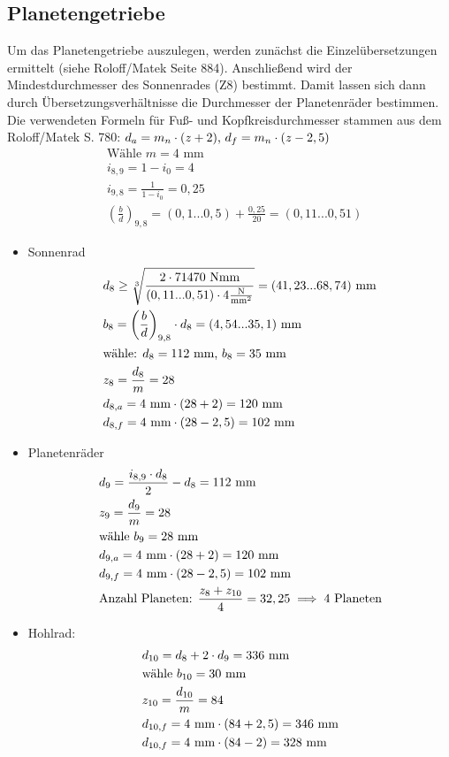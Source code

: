 \subsection{Planetengetriebe}
Um das Planetengetriebe auszulegen, werden zunächst die Einzelübersetzungen ermittelt (siehe Roloff/Matek Seite 884). Anschließend wird der Mindestdurchmesser des Sonnenrades (Z8) bestimmt. Damit lassen sich dann durch Übersetzungsverhältnisse die Durchmesser der Planetenräder bestimmen.
Die verwendeten Formeln für Fuß- und Kopfkreisdurchmesser stammen aus dem Roloff/Matek S. 780: $d_a = m_n \cdot (z + 2) \text{, } d_f = m_n \cdot (z-2,5) $
\begin{align*}
	&\text{Wähle } m=4  \text{ mm} \\
	&i_{8,9} = 1 - i_0 = 4 \\
	&i_{9,8} = \frac{1}{1-i_0}  = 0,25 \\
	& \left(\frac{b}{d} \right) _{9,8} = (0,1...0,5) + \frac{0,25}{20}  =  (0,11...0,51) 
\end{align*}
\begin{itemize}
\item Sonnenrad
\begin{align*}
	&d_8 \ge \sqrt[3]{\frac{2 \cdot 71470 \text{ Nmm}}{(0,11...0,51) \cdot  4 \frac{\text{N}}{\text{mm}^2}}}= (41,23...68,74) \text{ mm}\\
	&b_8= \left(\frac{b}{d} \right) _{9,8}  \cdot d_8 = (4,54...35,1) \text{ mm}  \\
	&\text{wähle: } d_8 = 112 \text{ mm, } b_8 = 35 \text{ mm}  \\
	&z_8 = \frac{d_8}{m} = 28 \\
	&d_{8,a} = 4\text{ mm} \cdot (28+2) =120\text{ mm} \\
	&d_{8,f} = 4\text{ mm} \cdot (28-2,5) =102\text{ mm} 
\end{align*}
\item Planetenräder 
\begin{align*}
	&d_9 = \frac{i_{8,9} \cdot d_8}{2 } - d_8 = 112 \text{ mm}  \\
	&z_9 = \frac{d_9}{m} = 28 \\
	&\text{wähle }  b_9 = 28 \text{ mm}  \\
	&d_{9,a} = 4\text{ mm} \cdot (28+2) =120\text{ mm} \\
	&d_{9,f} = 4\text{ mm} \cdot (28-2,5) =102\text{ mm} \\ 
	&\text{Anzahl Planeten: } \frac{z_{8} + z_{10}}{4} = 32,25 \implies 4 \text{ Planeten} 
\end{align*}	
\item Hohlrad:
\begin{align*}
	&d_{10} = d_8 + 2\cdot d_9 = 336 \text{ mm}  \\
	&\text{wähle }  b_{10} = 30 \text{ mm}  \\
	&z_{10}  = \frac{d_{10}}{m} = 84 \\
	&d_{10,f} = 4\text{ mm} \cdot (84+2,5) =346\text{ mm} \\
	&d_{10,f} = 4\text{ mm} \cdot (84-2) =328\text{ mm} 
\end{align*}	
\end{itemize}
